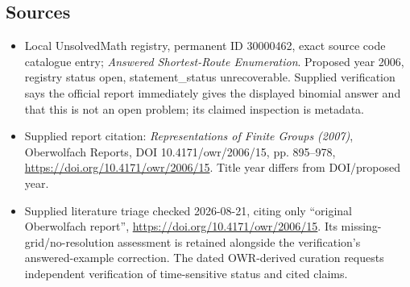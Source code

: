 \documentclass[11pt]{article}
\begin{document}
\subsection{Sources}
\begin{itemize}
\item Local UnsolvedMath registry, permanent ID 30000462, exact source code catalogue entry; \emph{Answered Shortest-Route Enumeration}. Proposed year 2006, registry status open, statement\_status unrecoverable. Supplied verification says the official report immediately gives the displayed binomial answer and that this is not an open problem; its claimed inspection is metadata.
\item Supplied report citation: \emph{Representations of Finite Groups (2007)}, Oberwolfach Reports, DOI 10.4171/owr/2006/15, pp. 895--978, \url{https://doi.org/10.4171/owr/2006/15}. Title year differs from DOI/proposed year.
\item Supplied literature triage checked 2026-08-21, citing only ``original Oberwolfach report'', \url{https://doi.org/10.4171/owr/2006/15}. Its missing-grid/no-resolution assessment is retained alongside the verification's answered-example correction. The dated OWR-derived curation requests independent verification of time-sensitive status and cited claims.
\end{itemize}
\end{document}
